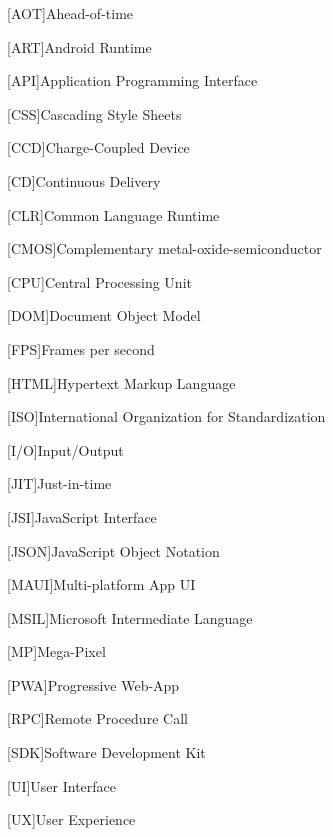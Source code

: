 \begin{acronym}[AAAAA]

[AOT]{Ahead-of-time}

[ART]{Android Runtime}

[API]{Application Programming Interface}

[CSS]{Cascading Style Sheets}

[CCD]{Charge-Coupled Device}

[CD]{Continuous Delivery}

[CLR]{Common Language Runtime}

[CMOS]{Complementary metal-oxide-semiconductor}

[CPU]{Central Processing Unit}

[DOM]{Document Object Model}

[FPS]{Frames per second}

[HTML]{Hypertext Markup Language}

[ISO]{International Organization for Standardization}

[I/O]{Input/Output}

[JIT]{Just-in-time}

[JSI]{JavaScript Interface}

[JSON]{JavaScript Object Notation}

[MAUI]{Multi-platform App UI}

[MSIL]{Microsoft Intermediate Language}

[MP]{Mega-Pixel}

[PWA]{Progressive Web-App}

[RPC]{Remote Procedure Call}

[SDK]{Software Development Kit}

[UI]{User Interface}

[UX]{User Experience}

\end{acronym}